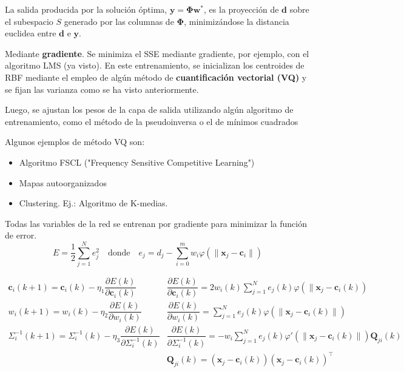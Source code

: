 La salida producida por la solución óptima, $\mathbf{y=\Phi w^*}$, es la proyección de $\mathbf{d}$ sobre el subespacio $S$ generado por las columnas de $\mathbf{\Phi}$, minimizándose la distancia euclidea entre $\mathbf{d}$ e $\mathbf{y}$.

Mediante \textbf{gradiente}. Se minimiza el SSE mediante gradiente, por ejemplo, con el algoritmo LMS (ya visto).
En este entrenamiento, se inicializan los centroides de RBF mediante el empleo de algún método de \textbf{cuantificación vectorial (VQ)} y se fijan las varianza como se ha visto anteriormente.

Luego, se ajustan los pesos de la capa de salida utilizando algún algoritmo de entrenamiento, como el método de la pseudoinversa o el de mínimos cuadrados

Algunos ejemplos de método VQ son:
\begin{itemize}
\item Algoritmo FSCL ("Frequency Sensitive Competitive Learning")
\item Mapas autoorganizados
\item Clustering. Ej.: Algoritmo de K-medias.
\end{itemize}
Todas las variables de la red se entrenan por gradiente para minimizar la función de error. \[ \boxed{E=\dfrac{1}{2}\sum_{j=1}^{N}e_j^2}\quad\mathrm{donde}\quad e_j=d_j-\sum_{i=0}^{m}w_i\varphi(\|\mathbf{x}_j-\mathbf{c}_i\|) \]

\[ \begin{array}{rl}
	\mathbf{c}_i(k+1)=\mathbf{c}_i(k)-\eta_1\dfrac{\partial E(k)}{\partial \mathbf{c}_i(k)} & \dfrac{\partial E(k)}{\partial \mathbf{c}_i(k)}=2w_i(k)\sum_{j=1}^Ne_j(k)\varphi(\|\mathbf{x}_j-\mathbf{c}_i(k)) \\
	w_{i}(k+1)=w_{i}(k)-\eta_{2}\dfrac{ \partial E(k) }{ \partial w_{i}(k) }  & \dfrac{ \partial E(k) }{ \partial w_{i}(k) }=\sum_{j=1}^{N}e_{j}(k)\varphi(\|\mathbf{x}_{j}-\mathbf{c}_{i}(k) \|)  \\
	\Sigma_{i}^{-1}(k+1)=\Sigma_{i}^{-1}(k)-\eta_{3}\dfrac{ \partial E(k) }{ \partial \Sigma_{i}^{-1}(k) }  & \dfrac{ \partial E(k) }{ \partial \Sigma_{i}^{-1}(k) } =-w_{i}\sum_{j=1}^{N}e_{j}(k)\varphi'(\|\mathbf{x}_{j}-\mathbf{c}_{i}(k)\|)\mathbf{Q}_{ji}(k) \\
	& \mathbf{Q}_{ji}(k)=(\mathbf{x}_{j}-\mathbf{c}_{i}(k))(\mathbf{x}_{j}-\mathbf{c}_{i}(k))^{\intercal}
\end{array}  \]